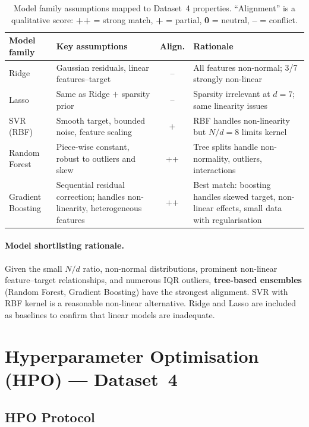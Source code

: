 \documentclass[12pt,a4paper]{article}
\begin{document}
\begin{table}[h]
\centering
\caption{Model family assumptions mapped to Dataset~4 properties.
  ``Alignment'' is a qualitative score: \textbf{++} = strong match,
  \textbf{+} = partial, \textbf{0} = neutral, \textbf{--} = conflict.}
\label{tab:ds4_alignment}
\small
\begin{tabular}{p{2.5cm}p{4.5cm}cp{4.5cm}}
\toprule
Model family & Key assumptions & Align. & Rationale \\
\midrule
Ridge & Gaussian residuals, linear features--target & -- & All features non-normal; 3/7 strongly non-linear \\
Lasso & Same as Ridge $+$ sparsity prior & -- & Sparsity irrelevant at $d=7$; same linearity issues \\
SVR (RBF) & Smooth target, bounded noise, feature scaling & + & RBF handles non-linearity but $N/d=8$ limits kernel \\
Random Forest & Piece-wise constant, robust to outliers and skew & ++ & Tree splits handle non-normality, outliers, interactions \\
Gradient Boosting & Sequential residual correction; handles non-linearity, heterogeneous features & ++ & Best match: boosting handles skewed target, non-linear effects, small data with regularisation \\
\bottomrule
\end{tabular}
\end{table}

\paragraph{Model shortlisting rationale.}
Given the small $N/d$ ratio, non-normal distributions, prominent
non-linear feature--target relationships, and numerous IQR outliers,
\textbf{tree-based ensembles} (Random Forest, Gradient Boosting) have
the strongest alignment.  SVR with RBF kernel is a reasonable non-linear
alternative.  Ridge and Lasso are included as baselines to confirm that
linear models are inadequate.

\section{Hyperparameter Optimisation (HPO) — Dataset~4}
\label{sec:hpo}

\subsection{HPO Protocol}
\end{document}

